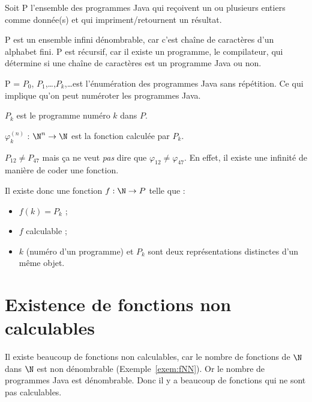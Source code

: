 \begin{mydef}[P]
	Soit P l'ensemble des programmes Java qui reçoivent un ou plusieurs entiers comme donnée(s) et qui impriment/retournent un résultat.
\end{mydef}

\begin{myprop}
	P est un ensemble infini dénombrable, car c'est chaîne de caractères d'un alphabet fini. P est récursif, car il existe un programme, le compilateur, qui détermine si une chaîne de caractères est un programme Java ou non.
\end{myprop}

\begin{mydef}[Énumération de P]
	P = $P_0$, $P_1$,\dots,$P_k$,\dots est l'énumération des programmes Java sans répétition. Ce qui implique qu'on peut numéroter les programmes Java.\\
\end{mydef}

\begin{mydef}[$P_k$]
	$P_k$ est le programme numéro $k$ dans $P$.
\end{mydef}

\begin{mydef}[$\varphi^{(n)}_k$]
	$\varphi^{(n)}_k$ : $\N^n \rightarrow \N$ est la fonction calculée par $P_k$.
\end{mydef}

\begin{myrem}
  $P_{12} \neq P_{47}$ mais ça ne veut \emph{pas} dire que $\varphi_{12} \neq \varphi_{47}$. En effet, il existe une infinité de manière de coder une fonction.
\end{myrem}

\begin{myprop}
	Il existe donc une fonction $f : \N\rightarrow P$ telle que :
	\begin{itemize}
		\item $f(k) = P_k$ ;
		\item $f$ calculable ;
		\item $k$ (numéro d'un programme) et $P_k$ sont deux représentations
			distinctes d'un même objet.
	\end{itemize}
\end{myprop}


\section{Existence de fonctions non calculables}
\label{sec:existence_de_fonction_non_calculables}
Il existe beaucoup de fonctions non calculables, car le nombre de fonctions de $\N$ dans $\N$ est non dénombrable (Exemple~\ref{exem:fNN}).
Or le nombre de programmes Java est dénombrable.
Donc il y a beaucoup de fonctions qui ne sont pas calculables.

